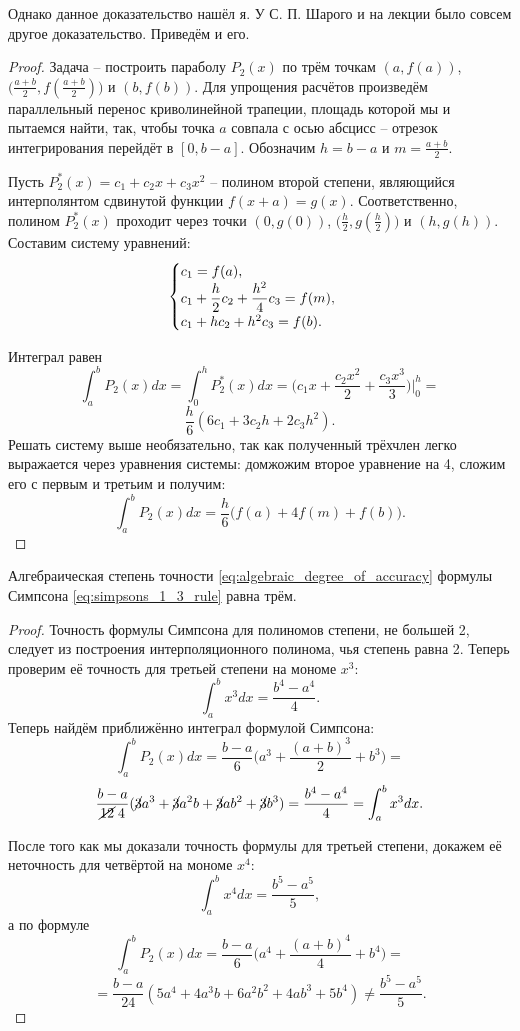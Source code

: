\documentclass[../main.tex]{subfile}
\begin{document}
Однако данное доказательство нашёл я. У С. П. Шарого и на лекции было совсем
другое доказательство. Приведём и его.

\begin{proof}
	Задача -- построить параболу $P_2(x)$ по трём точкам $(a,f(a))$,
	$\big(\frac{a+b}{2},f(\frac{a+b}{2})\big)$ и $(b,f(b))$. Для упрощения
	расчётов произведём параллельный перенос криволинейной трапеции, площадь
	которой мы и пытаемся найти, так, чтобы точка $a$ совпала с осью
	абсцисс -- отрезок интегрирования перейдёт в $[0,b-a]$. Обозначим
	$h=b-a$ и $m=\frac{a+b}{2}$.

	Пусть $P_2^*(x)=c_1+c_2x+c_3x^2$ -- полином второй степени, являющийся
	интерполянтом сдвинутой функции $f(x+a)=g(x)$. Соответственно, полином
	$P_2^*(x)$ проходит через точки $(0,g(0))$, $\big(\frac{h}{2},
	g(\frac{h}{2})\big)$ и $(h,g(h))$. Составим систему уравнений:
	\begin{equation*}
		\begin{cases}
			c_1 = f(a), \\
			c_1 + \mathlarger{\frac{h}{2}}c_2 + \mathlarger{\frac
				{h^2}{4}}c_3 = f(m), \\
			c_1 + h c_2 + h^2 c_3 = f(b). \\
		\end{cases}
	\end{equation*}

	Интеграл равен
	\[\int_a^b P_2(x)dx=\int_0^h P_2^*(x)dx=\Big(c_1x+\frac{c_2x^2}{2}+
	\frac{c_3x^3}{3}\Big)\Big|_0^h=\]
	\[\frac{h}{6}(6c_1+3c_2h+2c_3h^2).\]
	Решать систему выше необязательно, так как полученный трёхчлен легко
	выражается через уравнения системы: домжожим второе уравнение на 4,
	сложим его с первым и третьим и получим:
	\[\int_a^b P_2(x)dx=\frac{h}{6}\big(f(a)+4f(m)+f(b)\big).\]
\end{proof}



\begin{lemma}
	Алгебраическая степень точности \eqref{eq:algebraic_degree_of_accuracy}
	формулы Симпсона \eqref{eq:simpsons_1_3_rule} равна трём.
\end{lemma}

\begin{proof}
	Точность формулы Симпсона для полиномов степени, не большей 2, следует
	из построения интерполяционного полинома, чья степень равна 2. Теперь
	проверим её точность для третьей степени на мономе $x^3$:
	\[\int_a^b x^3dx=\frac{b^4-a^4}{4}.\]
	Теперь найдём приближённо интеграл формулой Симпсона:
	\[\int_a^b P_2(x)dx=\frac{b-a}{6}\Big(a^3+\frac{(a+b)^3}{2}+b^3\Big)=\]
	\[\frac{b-a}{\cancel{12}\;4}(\cancel{3}a^3+\cancel{3}a^2b+\cancel{3}ab^2
	+\cancel{3}b^3)=\frac{b^4-a^4}{4}=\int_a^b x^3dx.\]

	После того как мы доказали точность формулы для третьей степени, докажем
	её неточность для четвёртой на мономе $x^4$:
	\[\int_a^b x^4dx=\frac{b^5-a^5}{5},\]
	а по формуле
	\[\int_a^b P_2(x)dx=\frac{b-a}{6}\Big(a^4+\frac{(a+b)^4}{4}+b^4\Big)=\]
	\[=\frac{b-a}{24}(5a^4+4a^3b+6a^2b^2+4ab^3+5b^4)\ne\frac{b^5-a^5}{5}.\]
\end{proof}
\end{document}
